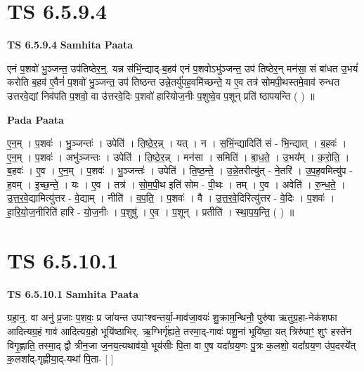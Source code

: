 \documentclass[17pt]{extarticle}
\begin{document}
\section*{ TS 6.5.9.4 }

\textbf{TS 6.5.9.4 } \newline
\textbf{Samhita Paata} \newline

एनं प॒शवो॑ भु॒ञ्जन्त॒ उप॑तिष्ठेर॒न्॒. यन्न स॑भिं॒न्द्याद्-ब॒हव॑ एनं प॒शवोऽभु॑ञ्जन्त॒ उप॑ तिष्ठेर॒न् मन॑सा॒ सं बा॑धत उ॒भयं॑ करोति ब॒हव॑ ए॒वैनं॑ प॒शवो॑ भु॒ञ्जन्त॒ उप॑ तिष्ठन्त उन्ने॒तर्यु॑पह॒वमि॑च्छन्ते॒ य ए॒व तत्र॑ सोमपी॒थस्तमे॒वाव॑ रुन्धत उत्तरवे॒द्यां निव॑पति प॒शवो॒ वा उ॑त्तरवे॒दिः प॒शवो॑ हारियोज॒नीः प॒शुष्वे॒व प॒शून् प्रति॑ ष्ठापयन्ति ( ) ॥ \newline

\textbf{Pada Paata} \newline

ए॒न॒म् । प॒शवः॑ । भु॒ञ्जन्तः॑ । उपेति॑ । ति॒ष्ठे॒र॒न्न् । यत् । न । स॒भिं॒न्द्यादिति॑ सं - भि॒न्द्यात् । ब॒हवः॑ । ए॒न॒म् । प॒शवः॑ । अभु॑ञ्जन्तः । उपेति॑ । ति॒ष्ठे॒र॒न्न् । मन॑सा । समिति॑ । बा॒ध॒ते॒ । उ॒भय᳚म् । क॒रो॒ति॒ । ब॒हवः॑ । ए॒व । ए॒न॒म् । प॒शवः॑ । भु॒ञ्जन्तः॑ । उपेति॑ । ति॒ष्ठ॒न्ते॒ । उ॒न्ने॒तरीत्यु॑त् - ने॒तरि॑ । उ॒प॒ह॒वमित्यु॑प - ह॒वम् । इ॒च्छ॒न्ते॒ । यः । ए॒व । तत्र॑ । सो॒म॒पी॒थ इति॑ सोम - पी॒थः । तम् । ए॒व । अवेति॑ । रु॒न्ध॒ते॒ । उ॒त्त॒र॒वे॒द्यामित्यु॑त्तर - वे॒द्याम् । नीति॑ । व॒प॒ति॒ । प॒शवः॑ । वै । उ॒त्त॒र॒वे॒दिरित्यु॑त्तर - वे॒दिः । प॒शवः॑ । हा॒रि॒यो॒ज॒नीरिति॑ हारि - यो॒ज॒नीः । प॒शुषु॑ । ए॒व । प॒शून् । प्रतीति॑ । स्था॒प॒य॒न्ति॒ ( ) ॥  \newline




\section*{ TS 6.5.10.1 }

\textbf{TS 6.5.10.1 } \newline
\textbf{Samhita Paata} \newline

ग्रहा॒न्॒. वा अनु॑ प्र॒जाः प॒शवः॒ प्र जा॑यन्त उपाꣳश्वन्तर्या॒-माव॑जा॒वयः॑ शु॒क्राम॒न्थिनौ॒ पुरु॑षा ऋतुग्र॒हा-नेक॑शफा आदित्यग्र॒हं गाव॑ आदित्यग्र॒हो भूयि॑ष्ठाभिर्. ऋ॒ग्भिर्गृ॑ह्यते॒ तस्मा॒द्-गावः॑ पशू॒नां भूयि॑ष्ठा॒ यत् त्रिरु॑पाꣳ॒॒ शुꣳ हस्ते॑न विगृ॒ह्णाति॒ तस्मा॒द् द्वौ त्रीन॒जा ज॒नय॒त्यथाव॑यो॒ भूय॑सीः पि॒ता वा ए॒ष यदा᳚ग्रय॒णः पु॒त्रः क॒लशो॒ यदा᳚ग्रय॒ण उ॑प॒दस्ये᳚त् क॒लशा᳚द्-गृह्णीया॒द्-यथा॑ पि॒ता- [  ] \newline
\end{document}
